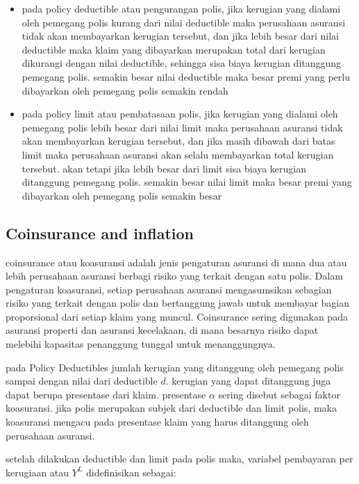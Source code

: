 \documentclass[
]{book}
\begin{document}
\begin{itemize}
\item
  pada policy deductible atau pengurangan polis, jika kerugian yang dialami oleh pemegang polis kurang dari nilai deductible maka perusahaan asuransi tidak akan membayarkan kerugian tersebut, dan jika lebih besar dari nilai deductible maka klaim yang dibayarkan merupakan total dari kerugian dikurangi dengan nilai deductible, sehingga sisa biaya kerugian ditanggung pemegang polis.
  semakin besar nilai deductible maka besar premi yang perlu dibayarkan oleh pemegang polis semakin rendah
\item
  pada policy limit atau pembatasaan polis, jika kerugian yang dialami oleh pemegang polis lebih besar dari nilai limit maka perusahaan asuransi tidak akan membayarkan kerugian tersebut, dan jika masih dibawah dari batas limit maka perusahaan asuransi akan selalu membayarkan total kerugian tersebut. akan tetapi jika lebih besar dari limit sisa biaya kerugian ditanggung pemegang polis.
  semakin besar nilai limit maka besar premi yang dibayarkan oleh pemegang polis semakin besar
\end{itemize}

\hypertarget{coinsurance-and-inflation}{%
\subsection{Coinsurance and inflation}\label{coinsurance-and-inflation}}

coinsurance atau koasuransi adalah jenis pengaturan asuransi di mana dua atau lebih perusahaan asuransi berbagi risiko yang terkait dengan satu polis. Dalam pengaturan koasuransi, setiap perusahaan asuransi mengasumsikan sebagian risiko yang terkait dengan polis dan bertanggung jawab untuk membayar bagian proporsional dari setiap klaim yang muncul. Coinsurance sering digunakan pada asuransi properti dan asuransi kecelakaan, di mana besarnya risiko dapat melebihi kapasitas penanggung tunggal untuk menanggungnya.

pada Policy Deductibles jumlah kerugian yang ditanggung oleh pemegang polis sampai dengan nilai dari deductible \(d\). kerugian yang dapat ditanggung juga dapat berupa presentase dari klaim. presentase \(\alpha\) sering disebut sebagai faktor koasuransi. jika polis merupakan subjek dari deductible dan limit polis, maka koasuransi mengacu pada presentase klaim yang harus ditanggung oleh perusahaan asuransi.

setelah dilakukan deductible dan limit pada polis maka, variabel pembayaran per kerugiaan atau \(Y^L\) didefinisikan sebagai:
\end{document}
